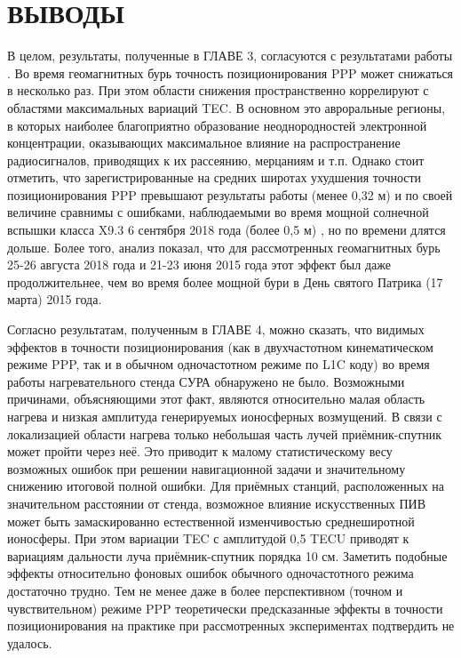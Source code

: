 \chapter*{ВЫВОДЫ}

В целом, результаты, полученные в ГЛАВЕ 3, согласуются с результатами работы \cite{Luo2018}.
Во время геомагнитных бурь точность позиционирования PPP может снижаться в несколько раз.
При этом области снижения пространственно коррелируют с областями максимальных вариаций TEC.
В основном это авроральные регионы, в которых наиболее благоприятно образование неоднородностей электронной концентрации, оказывающих максимальное влияние на распространение радиосигналов, приводящих к их рассеянию, мерцаниям и т.п.
Однако стоит отметить, что зарегистрированные на средних широтах ухудшения точности позиционирования PPP превышают результаты работы \cite{Luo2018} (менее 0,32 м) и по своей величине сравнимы с ошибками, наблюдаемыми во время мощной солнечной вспышки класса X9.3 6 сентября 2018 года (более 0,5 м) \cite{Yasyukevich2018}, но по времени длятся дольше.
Более того, анализ показал, что для рассмотренных геомагнитных бурь 25-26 августа 2018 года и 21-23 июня 2015 года этот эффект был даже продолжительнее, чем во время более мощной бури в День святого Патрика (17 марта) 2015 года. 

Согласно результатам, полученным в ГЛАВЕ 4, можно сказать, что видимых эффектов в точности позиционирования (как в двухчастотном кинематическом режиме PPP, так и в обычном одночастотном режиме по L1C коду) во время работы нагревательного стенда СУРА обнаружено не было. 
Возможными причинами, объясняющими этот факт, являются относительно малая область нагрева и низкая амплитуда генерируемых ионосферных возмущений.
В связи с локализацией области нагрева только небольшая часть лучей приёмник-спутник может пройти через неё.
Это приводит к малому статистическому весу возможных ошибок при решении навигационной задачи и значительному снижению итоговой полной ошибки. 
Для приёмных станций, расположенных на значительном расстоянии от стенда, возможное влияние искусственных ПИВ может быть замаскированно естественной изменчивостью среднеширотной ионосферы.
При этом вариации TEC с амплитудой 0,5 TECU приводят к вариациям дальности луча приёмник-спутник порядка 10 см. 
Заметить подобные эффекты относительно фоновых ошибок обычного одночастотного режима достаточно трудно.
Тем не менее даже в более перспективном (точном и чувствительном) режиме PPP теоретически предсказанные эффекты в точности позиционирования на практике при рассмотренных экспериментах подтвердить не удалось.
